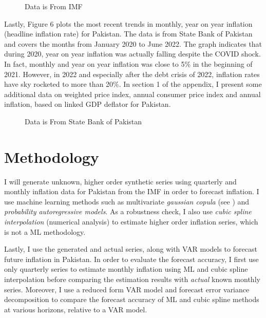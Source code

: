 \documentclass[12pt]{article}
\newcommand{\1}{\mathbbm 1}
\begin{document}
		
		\begin{figure}[H]
			\centering
			\scalebox{0.6}{}
			\hfill
			\caption{Data is From IMF}
		\end{figure}
		
		Lastly, Figure 6 plots the most recent trends in monthly, year on year inflation (headline inflation rate)  for Pakistan. The data is from State Bank of Pakistan and covers the months from January 2020 to June 2022. The graph indicates that during 2020, year on year inflation was actually falling despite the COVID shock. In fact, monthly and year on year inflation was close to 5\% in the beginning of 2021. However, in 2022 and especially after the debt crisis of 2022, inflation rates have sky rocketed to more than 20\%. In section 1 of the appendix, I present some additional data on weighted price index, annual consumer price index and annual inflation, based on linked GDP deflator for Pakistan.
		
		\begin{figure}[H]
			\centering
			\scalebox{0.8}{}
			\hfill
			\caption{Data is From State Bank of Pakistan}
		\end{figure}
		
		\section{Methodology}
		
		
		
		
		I will generate unknown, higher order synthetic series using quarterly and monthly inflation data for Pakistan from the IMF in order to forecast inflation. I use machine learning methods such as multivariate \textit{gaussian copula} (see \cite{patki2016synthetic}) and \textit{probability autoregressive models}. As a robustness check, I also use \textit{cubic spline interpolation} (numerical analysis) to estimate higher order inflation series, which is not a ML methodology.
		
		Lastly, I use the generated and actual series, along with VAR models to forecast future inflation in Pakistan. In order to evaluate the forecast accuracy, I first use only quarterly series to estimate monthly inflation using ML and cubic spline interpolation before comparing the estimation results with \textit{actual} known monthly series. Moreover, I use a reduced form VAR model and forecast error variance decomposition to compare the forecast accuracy of ML and cubic spline methods at various horizons, relative to a VAR model.
		
\end{document}
